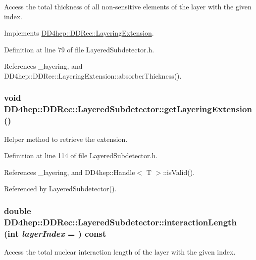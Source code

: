 Access the total thickness of all non-\/sensitive elements of the layer with the given index. 

Implements \hyperlink{class_d_d4hep_1_1_d_d_rec_1_1_layering_extension_ab4c19a0eccfd5cffc6816fa3b0ec9fb7}{DD4hep::DDRec::LayeringExtension}.

Definition at line 79 of file LayeredSubdetector.h.

References \_\-layering, and DD4hep::DDRec::LayeringExtension::absorberThickness().\hypertarget{class_d_d4hep_1_1_d_d_rec_1_1_layered_subdetector_a6abda5bb466aecbc60735dabe056a0eb}{
\subsubsection[{getLayeringExtension}]{\setlength{\rightskip}{0pt plus 5cm}void DD4hep::DDRec::LayeredSubdetector::getLayeringExtension ()}}
\label{class_d_d4hep_1_1_d_d_rec_1_1_layered_subdetector_a6abda5bb466aecbc60735dabe056a0eb}


Helper method to retrieve the extension. 

Definition at line 114 of file LayeredSubdetector.h.

References \_\-layering, and DD4hep::Handle$<$ T $>$::isValid().

Referenced by LayeredSubdetector().\hypertarget{class_d_d4hep_1_1_d_d_rec_1_1_layered_subdetector_a20c3329b432909abc794c717e141c6e2}{
\subsubsection[{interactionLength}]{\setlength{\rightskip}{0pt plus 5cm}double DD4hep::DDRec::LayeredSubdetector::interactionLength (int {\em layerIndex} = {}) const}}
\label{class_d_d4hep_1_1_d_d_rec_1_1_layered_subdetector_a20c3329b432909abc794c717e141c6e2}


Access the total nuclear interaction length of the layer with the given index. 

